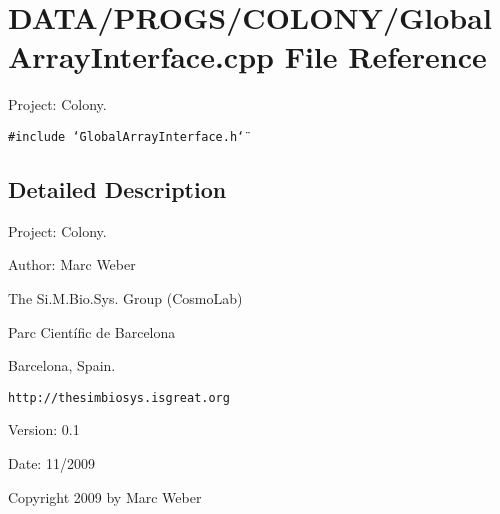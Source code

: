 \section{DATA/PROGS/COLONY/GlobalArrayInterface.cpp File Reference}
\label{GlobalArrayInterface_8cpp}
Project: Colony. 

{\tt \#include \char`\"{}GlobalArrayInterface.h\char`\"{}}\par


\subsection{Detailed Description}
Project: Colony. 

\begin{Desc}
\item[Author:]Marc Weber\par
 The Si.M.Bio.Sys. Group (CosmoLab)\par
 Parc Científic de Barcelona\par
 Barcelona, Spain.\par
 {\tt http://thesimbiosys.isgreat.org} \end{Desc}
\begin{Desc}
\item[Version:]0.1 \end{Desc}
\begin{Desc}
\item[Date:]11/2009\end{Desc}
Copyright 2009 by Marc Weber 
